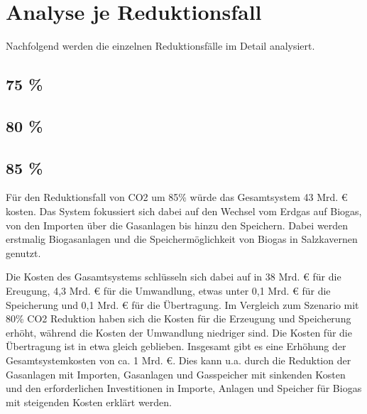 \section{Analyse je Reduktionsfall}
Nachfolgend werden die einzelnen Reduktionsfälle im Detail analysiert.


\subsection{75 \%}

\subsection{80 \%}

\subsection{85 \%}

Für den Reduktionsfall von CO2 um 85\% würde das Gesamtsystem 43 Mrd. € kosten. Das System fokussiert sich dabei auf den Wechsel vom Erdgas auf Biogas, von den Importen über die Gasanlagen bis hinzu den Speichern. Dabei werden erstmalig Biogasanlagen und die Speichermöglichkeit von Biogas in Salzkavernen genutzt.

Die Kosten des Gasamtsystems schlüsseln sich dabei auf in 38 Mrd. € für die Ereugung, 4,3 Mrd. € für die Umwandlung, etwas unter 0,1 Mrd. € für die Speicherung und 0,1 Mrd. € für die Übertragung.
\newline
Im Vergleich zum Szenario mit 80\% CO2 Reduktion haben sich die Kosten für die Erzeugung und Speicherung erhöht, während die Kosten der Umwandlung niedriger sind. Die Kosten für die Übertragung ist in etwa gleich geblieben. 
Insgesamt gibt es eine Erhöhung der Gesamtsystemkosten von ca. 1 Mrd. €. Dies kann u.a. durch die Reduktion der Gasanlagen mit Importen, Gasanlagen und Gasspeicher mit sinkenden Kosten und den erforderlichen Investitionen in Importe, Anlagen und Speicher für Biogas mit steigenden Kosten erklärt werden.



